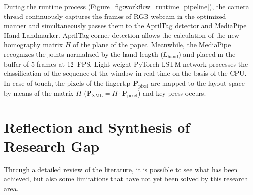 During the runtime process (Figure~\ref{fig:workflow_runtime_pipeline}), the camera thread continuously captures the frames of RGB webcam in the optimized manner and simultaneously passes them to the AprilTag detector and MediaPipe Hand Landmarker. AprilTag corner detection allows the calculation of the new homography matrix $H$ of the plane of the paper. Meanwhile, the MediaPipe recognizes the joints normalized by the hand length ($L_{\text{hand}}$) and placed in the buffer of 5 frames at 12~FPS. Light weight PyTorch LSTM network processes the classification of the sequence of the window in real-time on the basis of the CPU. In case of touch, the pixels of the fingertip $\mathbf{P}_{\text{pixel}}$ are mapped to the layout space by means of the matrix $H$ ($\mathbf{P}_{\text{XML}} = H \cdot \mathbf{P}_{\text{pixel}}$) and key press occurs.

\section{Reflection and Synthesis of Research Gap}
\label{sec:lit_reflection}
Through a detailed review of the literature, it is possible to see what has been achieved, but also some limitations that have not yet been solved by this research area.


